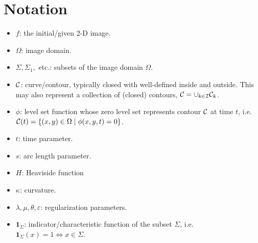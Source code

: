 \section{Notation}
\begin{itemize}
	\item $f$: the initial/given 2-D image.
	
	\item $\Omega$: image domain.
	
	\item $\Sigma, \Sigma_1,$ etc.: subsets of the image domain $\Omega$.
	
	\item $\mathcal{C}$: curve/contour, typically closed with well-defined inside and outside. This may also represent a collection of (closed) contours, $\mathcal{C} = \cup_{k \in \mathcal{I}} \mathcal{C}_k$.
	
	\item $\phi$: level set function whose zero level set represents contour $\mathcal{C}$ at time $t$, i.e. $\mathcal{C}(t) = \{(x,y) \in \Omega \mid \phi(x,y,t) = 0\}$. 
	
	\item $t$: time parameter. 
	
	\item $s$: arc length parameter.
	
	\item $H$: Heaviside function
	
	\item $\kappa$: curvature. 
	
	\item $\lambda, \mu, \theta, \varepsilon$: regularization parameters.
	
	\item $\mathbf{1}_\Sigma$: indicator/characteristic function of the subset $\Sigma$, i.e. $\mathbf{1}_\Sigma(x) = 1 \iff x \in \Sigma$.
	
\end{itemize}